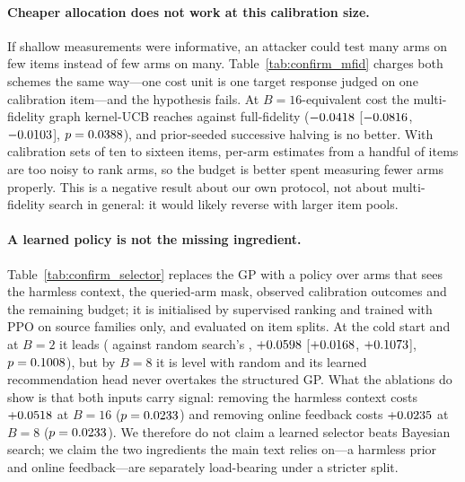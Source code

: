 \documentclass{article}
\begin{document}
\paragraph{Cheaper allocation does not work at this calibration size.} If shallow measurements were
informative, an attacker could test many arms on few items instead of few arms on many.
Table~\ref{tab:confirm_mfid} charges both schemes the same way---one cost unit is one target
response judged on one calibration item---and the hypothesis fails. At $B{=}16$-equivalent cost the
multi-fidelity graph kernel-UCB reaches \pjcfMfidMFBSixteen{} against full-fidelity
\pjcfMfidFullBSixteen{} ($-0.0418$ [$-0.0816$, $-0.0103$],
$p=0.0388$), and prior-seeded successive halving is no better. With calibration sets of
ten to sixteen items, per-arm estimates from a handful of items are too noisy to rank arms, so the
budget is better spent measuring fewer arms properly. This is a negative result about our own
protocol, not about multi-fidelity search in general: it would likely reverse with larger item pools.


\paragraph{A learned policy is not the missing ingredient.} Table~\ref{tab:confirm_selector} replaces
the GP with a policy over arms that sees the harmless context, the queried-arm mask, observed
calibration outcomes and the remaining budget; it is initialised by supervised ranking and trained
with PPO on source families only, and evaluated on \pjcfSelSplits{} item splits. At the cold start
and at $B{=}2$ it leads (\pjcfSelPPOBTwo{} against random search's \pjcfSelRandBTwo{},
$+0.0598$ [$+0.0168$, $+0.1073$], $p=0.1008$),
but by $B{=}8$ it is level with random and its learned recommendation head never overtakes the
structured GP. What the ablations do show is that both inputs carry signal: removing the harmless
context costs $+0.0518$ at $B{=}16$ ($p=0.0233$) and removing online
feedback costs $+0.0235$ at $B{=}8$ ($p=0.0233$). We therefore do not claim a
learned selector beats Bayesian search; we claim the two ingredients the main text relies on---a
harmless prior and online feedback---are separately load-bearing under a stricter split.

\end{document}
